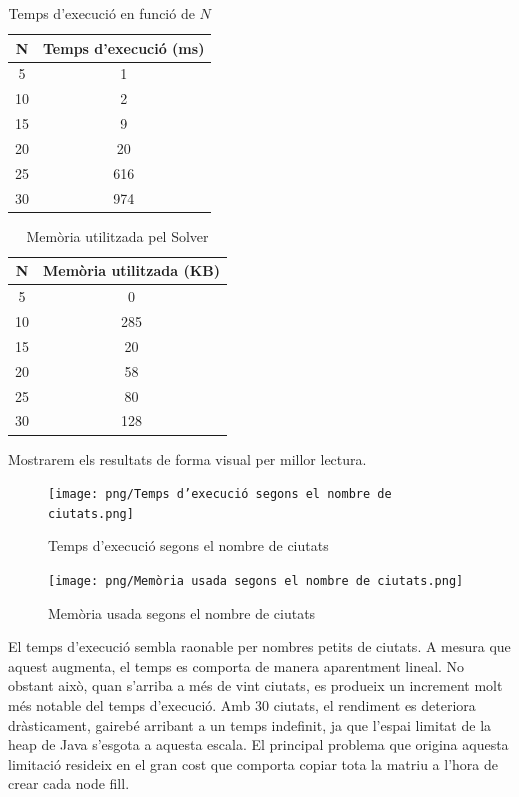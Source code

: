 \documentclass{ieeetj}
\begin{document}
\begin{table}[H]
\centering
\caption{Temps d'execució en funció de $N$}
\begin{tabular}{|c|c|}
\hline
\textbf{N} & \textbf{Temps d'execució (ms)} \\
\hline
5 & 1 \\
10 & 2 \\
15 & 9 \\
20 & 20 \\
25 & 616 \\
30 & 974 \\
\hline
\end{tabular}
\end{table}

\begin{table}[H]
\centering
\caption{Memòria utilitzada pel Solver}
\begin{tabular}{|c|c|}
\hline
\textbf{N} & \textbf{Memòria utilitzada (KB)} \\
\hline
5 & 0 \\
10 & 285 \\
15 & 20 \\
20 & 58 \\
25 & 80 \\
30 &128 \\
\hline
\end{tabular}
\end{table}
Mostrarem els resultats de forma visual per millor lectura.
\begin{figure}[H]
    \centering
    \texttt{[image: png/Temps d'execució segons el nombre de ciutats.png]}
    \caption{Temps d'execució segons el nombre de ciutats}
\end{figure}

\begin{figure}[H]
    \centering
    \texttt{[image: png/Memòria usada segons el nombre de ciutats.png]}
    \caption{Memòria usada segons el nombre de ciutats}
\end{figure}

El temps d'execució sembla raonable per nombres petits de ciutats. A mesura que aquest augmenta, el temps es comporta de manera aparentment lineal. No obstant això, quan s'arriba a més de vint ciutats, es produeix un increment molt més notable del temps d'execució. Amb 30 ciutats, el rendiment es deteriora dràsticament, gairebé arribant a un temps indefinit, ja que l'espai limitat de la heap de Java s'esgota a aquesta escala. El principal problema que origina aquesta limitació resideix en el gran cost que comporta copiar tota la matriu a l'hora de crear cada node fill.\newline
\end{document}
